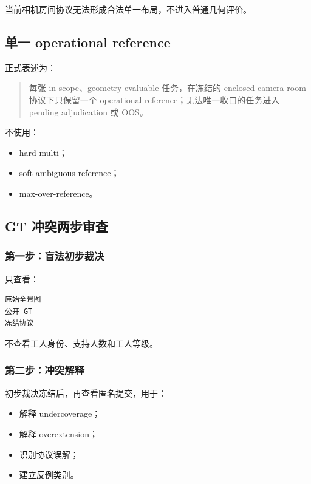 当前相机房间协议无法形成合法单一布局，不进入普通几何评价。

\subsection{单一 operational reference}

正式表述为：

\begin{quote}
每张 in-scope、geometry-evaluable 任务，在冻结的 enclosed camera-room 协议下只保留一个 operational reference；无法唯一收口的任务进入 pending adjudication 或 OOS。
\end{quote}

不使用：

\begin{itemize}
  \item hard-multi；
  \item soft ambiguous reference；
  \item max-over-reference。
\end{itemize}

\subsection{GT 冲突两步审查}

\subsubsection{第一步：盲法初步裁决}

只查看：

\begin{verbatim}
原始全景图
公开 GT
冻结协议
\end{verbatim}

不查看工人身份、支持人数和工人等级。

\subsubsection{第二步：冲突解释}

初步裁决冻结后，再查看匿名提交，用于：

\begin{itemize}
  \item 解释 undercoverage；
  \item 解释 overextension；
  \item 识别协议误解；
  \item 建立反例类别。
\end{itemize}

